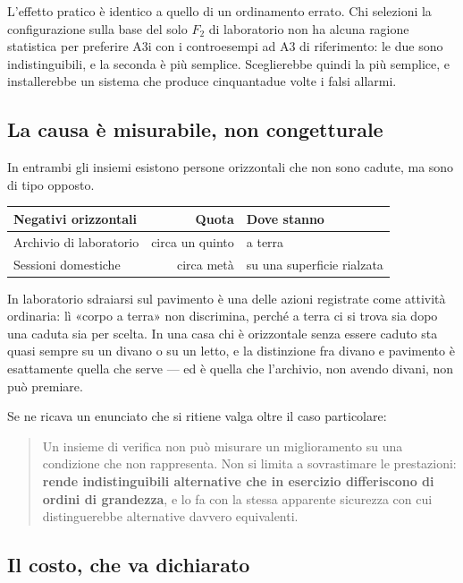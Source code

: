 L'effetto pratico è identico a quello di un ordinamento errato. Chi selezioni
la configurazione sulla base del solo $F_2$ di laboratorio non ha alcuna
ragione statistica per preferire A3i con i controesempi ad A3 di riferimento:
le due sono indistinguibili, e la seconda è più semplice. Sceglierebbe quindi
la più semplice, e installerebbe un sistema che produce cinquantadue volte i
falsi allarmi.

\subsection{La causa è misurabile, non congetturale}

In entrambi gli insiemi esistono persone orizzontali che non sono cadute, ma
sono di tipo opposto.

\begin{center}
\begin{tabular}{lrl}
\toprule
Negativi orizzontali & Quota & Dove stanno \\
\midrule
Archivio di laboratorio & circa un quinto & a terra \\
Sessioni domestiche & circa metà & su una superficie rialzata \\
\bottomrule
\end{tabular}
\end{center}

In laboratorio sdraiarsi sul pavimento è una delle azioni registrate come
attività ordinaria: lì «corpo a terra» non discrimina, perché a terra ci si
trova sia dopo una caduta sia per scelta. In una casa chi è orizzontale senza
essere caduto sta quasi sempre su un divano o su un letto, e la distinzione fra
divano e pavimento è esattamente quella che serve --- ed è quella che
l'archivio, non avendo divani, non può premiare.

Se ne ricava un enunciato che si ritiene valga oltre il caso particolare:

\begin{quote}
Un insieme di verifica non può misurare un miglioramento su una condizione che
non rappresenta. Non si limita a sovrastimare le prestazioni: \textbf{rende
indistinguibili alternative che in esercizio differiscono di ordini di
grandezza}, e lo fa con la stessa apparente sicurezza con cui distinguerebbe
alternative davvero equivalenti.
\end{quote}

\subsection{Il costo, che va dichiarato}


